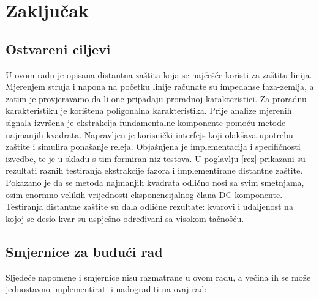 \chapter{Zaključak}

\section*{Ostvareni ciljevi}

U ovom radu je opisana distantna zaštita koja se najčešće koristi za zaštitu linija. Mjerenjem struja i napona na početku linije računate su impedanse faza-zemlja, a zatim je provjeravamo da li one pripadaju proradnoj karakteristici. Za proradnu karakteristiku je korištena poligonalna karakteristika. Prije analize mjerenih signala izvršena je ekstrakcija fundamentalne komponente pomoću metode najmanjih kvadrata. Napravljen je korisnički interfejs koji olakšava upotrebu zaštite i simulira ponašanje releja. Objašnjena je implementacija i specifičnosti izvedbe, te je u skladu s tim formiran niz testova. U poglavlju \ref{rez} prikazani su rezultati raznih testiranja ekstrakcije fazora i implementirane distantne zaštite. Pokazano je da se metoda najmanjih kvadrata odlično nosi sa svim smetnjama, osim enormno velikih vrijednosti eksponencijalnog člana DC komponente. Testiranja distantne zaštite su dala odlične rezultate: kvarovi  i udaljenost na kojoj se desio kvar su uspješno određivani sa visokom tačnošću.



\section*{Smjernice za budući rad}

Sljedeće napomene i smjernice nisu razmatrane u ovom radu, a većina ih se može jednostavno implementirati i nadograditi na ovaj rad: 

